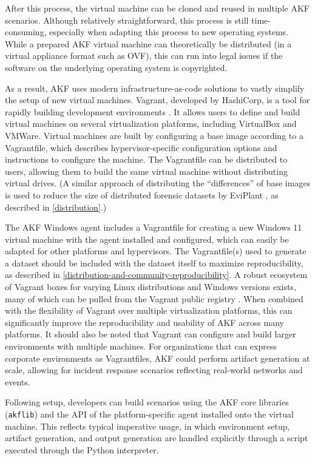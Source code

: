 \documentclass[letterpaper,12pt]{report}
\newcommand{\passthrough}[1]{#1}
\begin{document}
After this process, the virtual machine can be cloned and reused in
multiple AKF scenarios. Although relatively straightforward, this
process is still time-consuming, especially when adapting this process
to new operating systems. While a prepared AKF virtual machine can
theoretically be distributed (in a virtual appliance format such as
OVF), this can run into legal issues if the software on the underlying
operating system is copyrighted.

As a result, AKF uses modern infrastructure-as-code solutions to vastly
simplify the setup of new virtual machines. Vagrant, developed by
HashiCorp, is a tool for rapidly building development environments
\cite{HashicorpVagrant2025}. It allows users to define and build
virtual machines on several virtualization platforms, including
VirtualBox and VMWare. Virtual machines are built by configuring a base
image according to a Vagrantfile, which describes hypervisor-specific
configuration options and instructions to configure the machine. The
Vagrantfile can be distributed to users, allowing them to build the same
virtual machine without distributing virtual drives. (A similar approach
of distributing the ``differences'' of base images is used to reduce the
size of distributed forensic datasets by EviPlant
\cite{scanlonEviPlantEfficientDigital2017}, as described in
\autoref{distribution}.)

The AKF Windows agent includes a Vagrantfile for creating a new Windows
11 virtual machine with the agent installed and configured, which can
easily be adapted for other platforms and hypervisors. The
Vagrantfile(s) used to generate a dataset should be included with the
dataset itself to maximize reproducibility, as described in \autoref{distribution-and-community-reproducibility}. A robust ecosystem of Vagrant boxes for varying Linux
distributions and Windows versions exists, many of which can be pulled
from the Vagrant public registry
\cite{hashicorpHashiCorpCloudPlatform}. When combined with the
flexibility of Vagrant over multiple virtualization platforms, this can
significantly improve the reproducibility and usability of AKF across
many platforms. It should also be noted that Vagrant can configure and
build larger environments with multiple machines. For organizations that
can express corporate environments as Vagrantfiles, AKF could perform
artifact generation at scale, allowing for incident response scenarios
reflecting real-world networks and events.

Following setup, developers can build scenarios using the AKF core
libraries (\passthrough{\lstinline!akflib!}) and the API of the
platform-specific agent installed onto the virtual machine. This
reflects typical imperative usage, in which environment setup, artifact
generation, and output generation are handled explicitly through a
script executed through the Python interpreter.
\end{document}
